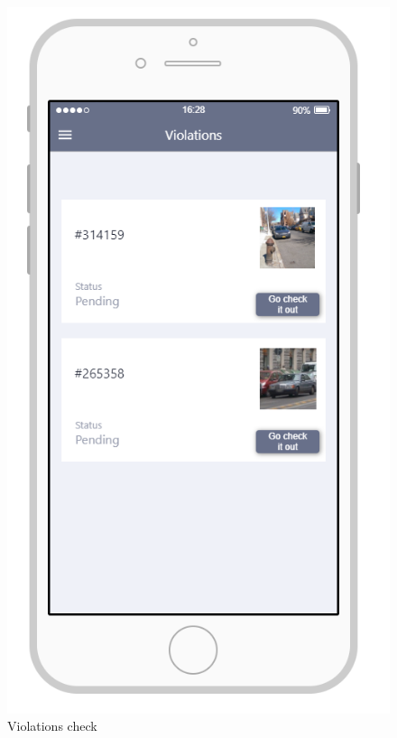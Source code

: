 \documentclass{article}
\begin{document}
\begin{figure}[H]
    \centering
    \includegraphics[scale=0.7]{Images/ViolationsAPP}
    \caption{Violations check}
\end{figure}
\end{document}
